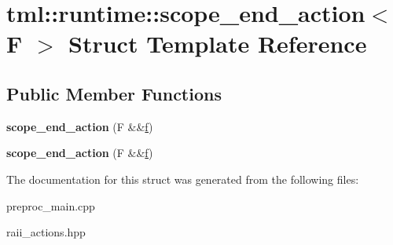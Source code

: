 \hypertarget{structtml_1_1runtime_1_1scope__end__action}{\section{tml\+:\+:runtime\+:\+:scope\+\_\+end\+\_\+action$<$ F $>$ Struct Template Reference}
\label{structtml_1_1runtime_1_1scope__end__action}
}
\subsection*{Public Member Functions}
\begin{DoxyCompactItemize}
\item 
\hypertarget{structtml_1_1runtime_1_1scope__end__action_a6e842e1073f521ad8bfac7dbb343d3ff}{{\bfseries scope\+\_\+end\+\_\+action} (F \&\&\hyperlink{structf}{f})}\label{structtml_1_1runtime_1_1scope__end__action_a6e842e1073f521ad8bfac7dbb343d3ff}

\item 
\hypertarget{structtml_1_1runtime_1_1scope__end__action_a6e842e1073f521ad8bfac7dbb343d3ff}{{\bfseries scope\+\_\+end\+\_\+action} (F \&\&\hyperlink{structf}{f})}\label{structtml_1_1runtime_1_1scope__end__action_a6e842e1073f521ad8bfac7dbb343d3ff}

\end{DoxyCompactItemize}


The documentation for this struct was generated from the following files\+:\begin{DoxyCompactItemize}
\item 
preproc\+\_\+main.\+cpp\item 
raii\+\_\+actions.\+hpp\end{DoxyCompactItemize}
